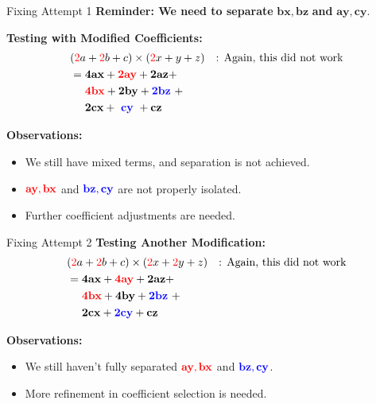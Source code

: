 \documentclass{beamer}
\begin{document}
\begin{frame}{Fixing Attempt 1}
    \textbf{Reminder: We need to separate } $\mathbf{bx, bz}$ \textbf{and} $\mathbf{ay, cy}$.
    
    \textbf{Testing with Modified Coefficients:}
    \begin{align*}
        &(\textcolor{red}{2}a + \textcolor{red}{2}b + c) \times (\textcolor{red}{2}x + y + z) \quad \text{: Again, this did not work} \\
        &= \mathbf{4ax} + \textcolor{red}{\mathbf{2ay}} + \mathbf{2az} + \\
        & \ \ \ \ \textcolor{red}{\mathbf{4bx}} + \mathbf{2by} + \textcolor{blue}{\mathbf{2bz}} \ + \\
        & \ \ \ \ \mathbf{2cx} + \ \textcolor{blue}{\mathbf{cy}} \ + \mathbf{cz}
    \end{align*}
    
    \textbf{Observations:}
    \begin{itemize}
        \item We still have mixed terms, and separation is not achieved.
        \item $\textcolor{red}{\mathbf{ay, bx}}$ and $\textcolor{blue}{\mathbf{bz, cy}}$ are not properly isolated.
        \item Further coefficient adjustments are needed.
    \end{itemize}
\end{frame}
\begin{frame}{Fixing Attempt 2}
    \textbf{Testing Another Modification:}
    \begin{align*}
        &(\textcolor{red}{2}a + \textcolor{red}{2}b + c) \times (\textcolor{red}{2}x + \textcolor{red}{2}y + z) \quad \text{: Again, this did not work} \\
        &= \mathbf{4ax} + \textcolor{red}{\mathbf{4ay}} + \mathbf{2az} + \\
        & \ \ \ \ \textcolor{red}{\mathbf{4bx}} + \mathbf{4by} + \textcolor{blue}{\mathbf{2bz}} \ + \\
        & \ \ \ \ \mathbf{2cx} + \textcolor{blue}{\mathbf{2cy}} + \mathbf{cz}
    \end{align*}

    \textbf{Observations:}
    \begin{itemize}
        \item We still haven’t fully separated $\textcolor{red}{\mathbf{ay, bx}}$ and $\textcolor{blue}{\mathbf{bz, cy}}$.
        \item More refinement in coefficient selection is needed.
    \end{itemize}
\end{frame}
\end{document}
